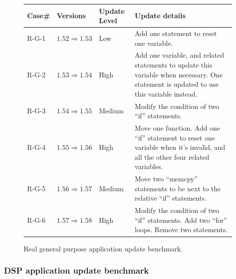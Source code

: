 \begin{figure}[htbp]
\begin{center}
\begin{small}
\begin{tabular}{||p{0.5in}|p{1in}|p{0.6in}|p{3.5in}||} \hline

Case\# & Versions & Update Level & Update details \\ \hline \hline

R-G-1 &  ${1.52 \Rightarrow 1.53}$ & Low & Add one statement to reset one variable. \\ \hline
R-G-2 &  ${1.53 \Rightarrow 1.54}$ & High & Add one variable, and related statements to
	update this variable when necessary. One statement is updated to use this variable instead. \\ \hline
R-G-3 &  ${1.54 \Rightarrow 1.55}$ & Medium & Modify the condition of two ``if'' statements. \\ \hline
R-G-4 &  ${1.55 \Rightarrow 1.56}$ & High & Move one function. Add one ``if'' statement to reset 
	one variable when it's invalid, and all the other four related variables. \\ \hline
R-G-5 &  ${1.56 \Rightarrow 1.57}$ & Medium & Move two ``memcpy'' statements to be next to the relative ``if'' statements. \\ \hline
R-G-6 &  ${1.57 \Rightarrow 1.58}$ & High & Modify the condition of two ``if'' statements. Add two ``for'' loops. 
Remove two statements. \\ \hline

\end{tabular}
\end{small}
\end{center}
\caption{Real general purpose application update benchmark.}
\label{fdeluge.src}
\end{figure}

\subsubsection{DSP application update benchmark}


